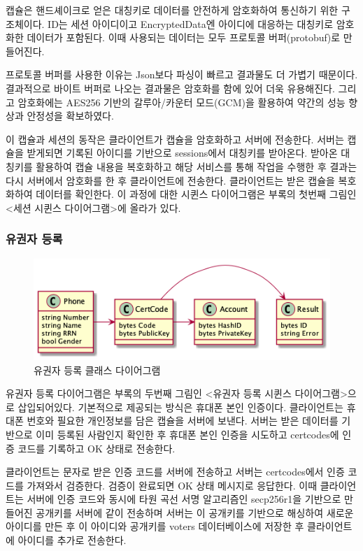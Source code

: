 \documentclass[10pt,a4paper,left=15mm,right=15mm,top=20mm,bottom=20mm]{article}
\begin{document}
    캡슐은 핸드셰이크로 얻은 대칭키로 데이터를 안전하게 암호화하여 통신하기 위한 구조체이다. ID는 세션 아이디이고 EncryptedData엔 아이디에 대응하는 대칭키로 암호화한 데이터가 포함된다. 이때 사용되는 데이터는 모두 프로토콜 버퍼(protobuf)로 만들어진다.

    프로토콜 버퍼를 사용한 이유는 Json보다 파싱이 빠르고 결과물도 더 가볍기 때문이다. 결과적으로 바이트 버퍼로 나오는 결과물은 암호화를 함에 있어 더욱 유용해진다. 그리고 암호화에는 AES256 기반의 갈루아/카운터 모드(GCM)을 활용하여 약간의 성능 향상과 안정성을 확보하였다.

    이 캡슐과 세션의 동작은 클라이언트가 캡슐을 암호화하고 서버에 전송한다. 서버는 캡슐을 받게되면 기록된 아이디를 기반으로 sessions에서 대칭키를 받아온다. 받아온 대칭키를 활용하여 캡슐 내용을 복호화하고 해당 서비스를 통해 작업을 수행한 후 결과는 다시 서버에서 암호화를 한 후 클라이언트에 전송한다. 클라이언트는 받은 캡슐을 복호화하여 데이터를 확인한다. 이 과정에 대한 시퀸스 다이어그램은 부록의 첫번째 그림인 <세션 시퀸스 다이어그램>에 올라가 있다.

    \subsubsection{유권자 등록}

    \begin{figure}[h]
        \begin{center}
            \includegraphics[width=12cm]{client-register-class}
            \caption{유권자 등록 클래스 다이어그램}
        \end{center}
    \end{figure}

    유권자 등록 다이어그램은 부록의 두번째 그림인 <유권자 등록 시퀸스 다이어그램>으로 삽입되어있다. 기본적으로 제공되는 방식은 휴대폰 본인 인증이다. 클라이언트는 휴대폰 번호와 필요한 개인정보를 담은 캡슐을 서버에 보낸다. 서버는 받은 데이터를 기반으로 이미 등록된 사람인지 확인한 후 휴대폰 본인 인증을 시도하고 certcodes에 인증 코드를 기록하고 OK 상태로 전송한다.

    클라이언트는 문자로 받은 인증 코드를 서버에 전송하고 서버는 certcodes에서 인증 코드를 가져와서 검증한다. 검증이 완료되면 OK 상태 메시지로 응답한다. 이때 클라이언트는 서버에 인증 코드와 동시에 타원 곡선 서명 알고리즘인 secp256r1을 기반으로 만들어진 공개키를 서버에 같이 전송하며 서버는 이 공개키를 기반으로 해싱하여 새로운 아이디를 만든 후 이 아이디와 공개키를 voters 데이터베이스에 저장한 후 클라이언트에 아이디를 추가로 전송한다.
\end{document}
